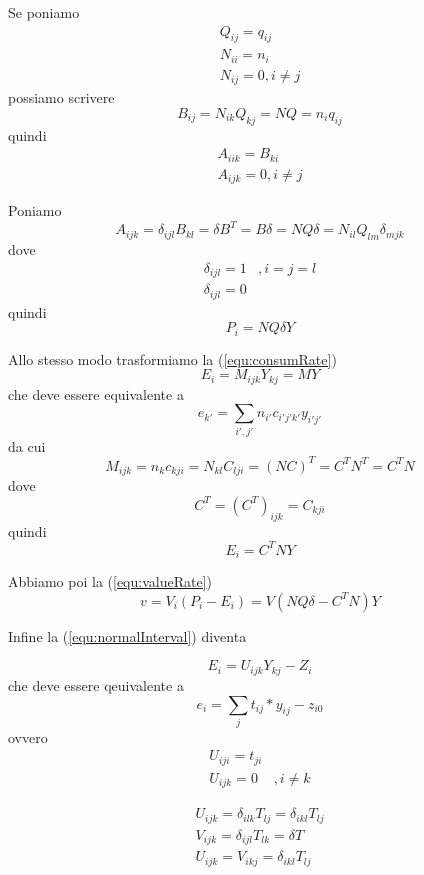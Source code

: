 \documentclass[a4paper,11pt]{article}
\begin{document}
Se poniamo
\[
\begin{array}{ll}
	Q_{ij} = q_{ij} \\
	N_{ii} = n_i \\
	N_{ij} = 0, i \ne j
\end{array}
\]
possiamo scrivere
\[
	B_{ij} = N_{ik} Q_{kj} = N Q = n_{i} q_{ij}
\]
quindi
\[
\begin{array}{ll}
	A_{iik} = B_{ki}\\
	A_{ijk} = 0, i \ne j
\end{array}
\]

Poniamo
\begin{equation}
\label{equ:NQI}
	A_{ijk} = \delta_{ijl} B_{kl} = \delta B^T = B \delta =
		N Q \delta = N_{il} Q_{lm} \delta_{mjk}
\end{equation}
dove
\[
\begin{array}{ll}
	\delta_{ijl} = 1 & , i = j = l \\
	\delta_{ijl} = 0
\end{array}
\]
quindi
\[
	P_i = N Q \delta Y
\]

Allo stesso modo trasformiamo la (\ref{equ:consumRate})
\[
	E_i = M_{ijk} Y_{kj} = M Y
\]
che deve essere equivalente a
\begin{equation}
\label{equ:e_k}
	e_{k'} = \sum_{i', j'} n_{i'} c_{i'j'k'} y_{i'j'}
\end{equation}
da cui
\begin{equation}
\label{equ:Mijk}
	M_{ijk} = n_k c_{kji} = N_{kl} C_{lji} = (NC)^T = C^T N^T = C^T N
\end{equation}
dove
\[
	C^T = (C^T)_{ijk} = C_{kji}
\]
quindi
\[
	E_i = C^T N Y
\]

Abbiamo poi la (\ref{equ:valueRate})
\[
	v = V_i (P_i - E_i)
	= V \left( N Q \delta - C^T N \right) Y
\]

Infine la (\ref{equ:normalInterval}) diventa

\[
	E_i = U_{ijk} Y_{kj} - Z_i
\]
che deve essere qeuivalente a
\[
	e_i = \sum_j t_{ij} * y_{ij} -z_{i0}
\]
ovvero
\[
\begin{array}{ll}
	U_{iji} = t_{ji} \\
	U_{ijk} = 0 &, i \ne k
\end{array}
\]

\[
\begin{array}{ll}
	U_{ijk}	= \delta_{ilk} T_{lj}
			= \delta_{ikl} T_{lj} \\
	V_{ijk}	= \delta_{ijl} T_{lk} = \delta T \\
	U_{ijk} = V_{ikj} = \delta_{ikl} T_{lj} \\
\end{array}
\]
\end{document}
